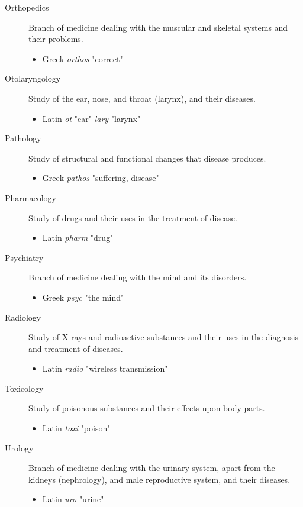 \documentclass[11pt]{article}
\begin{document}
\begin{description}
\item[{Orthopedics}] Branch of medicine dealing with the muscular and skeletal
systems and their problems.
\begin{itemize}
\item Greek \emph{orthos} "correct"
\end{itemize}

\item[{Otolaryngology}] Study of the ear, nose, and throat (larynx), and their
diseases.
\begin{itemize}
\item Latin \emph{ot} "ear" \emph{lary} "larynx"
\end{itemize}

\item[{Pathology}] Study of structural and functional changes that disease
produces.
\begin{itemize}
\item Greek \emph{pathos} "suffering, disease"
\end{itemize}

\item[{Pharmacology}] Study of drugs and their uses in the treatment of
disease.
\begin{itemize}
\item Latin \emph{pharm} "drug"
\end{itemize}

\item[{Psychiatry}] Branch of medicine dealing with the mind and its disorders.
\begin{itemize}
\item Greek \emph{psyc} "the mind"
\end{itemize}

\item[{Radiology}] Study of X-rays and radioactive substances and their uses in
the diagnosis and treatment of diseases.
\begin{itemize}
\item Latin \emph{radio} "wireless transmission"
\end{itemize}

\item[{Toxicology}] Study of poisonous substances and their effects upon body
parts.
\begin{itemize}
\item Latin \emph{toxi} "poison"
\end{itemize}

\item[{Urology}] Branch of medicine dealing with the urinary system, apart from
the kidneys (nephrology), and male reproductive system, and their
diseases.
\begin{itemize}
\item Latin \emph{uro} "urine"
\end{itemize}
\end{description}
\end{document}
